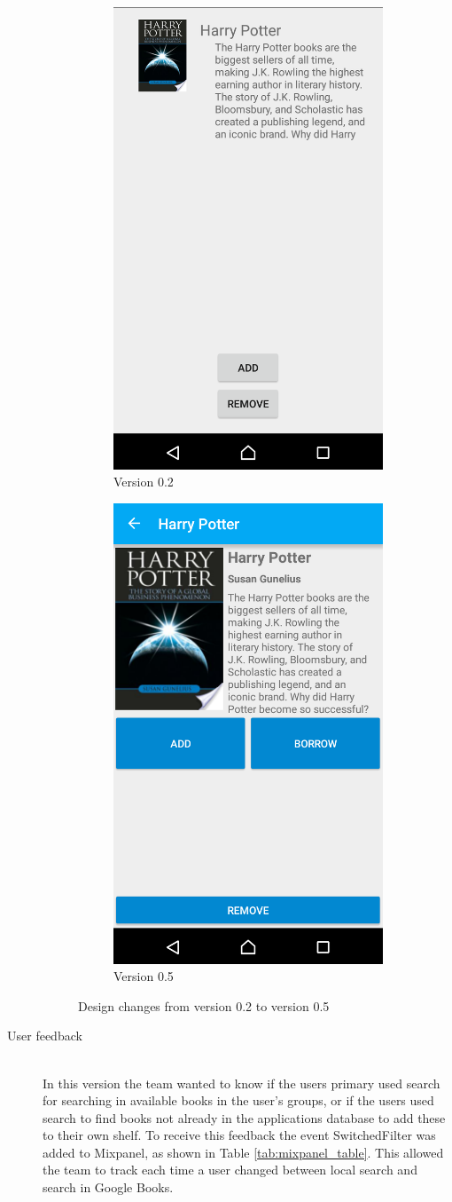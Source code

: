 \begin{description}
\begin{figure}
\centering
\begin{subfigure}{.5\textwidth}
  \centering
  \includegraphics[width=.4\textwidth]{figs/v02/bookView02.png}
  \caption{Version 0.2}
  \label{fig:androidcompare02}
\end{subfigure}%
\begin{subfigure}{.5\textwidth}
  \centering
  \includegraphics[width=.4\textwidth]{figs/v05/bookView05.png}
  \caption{Version 0.5}
  \label{fig:androidcompare05}
\end{subfigure}
\caption{Design changes from version 0.2 to version 0.5}
\label{fig:AndroidBookView05}
\end{figure}


    \item[User feedback] \hfill\\
In this version the team wanted to know if the users primary used search for searching in available books in the user's groups, or if the users used search to find books not already in the applications database to add these to their own shelf. To receive this feedback the event SwitchedFilter was added to Mixpanel, as shown in Table \ref{tab:mixpanel_table}. This allowed the team to track each time a user changed between local search and search in Google Books. 
\end{description}

